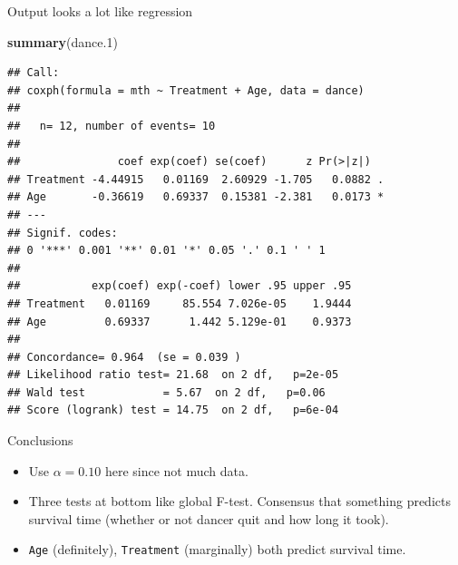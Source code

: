 \documentclass[
  ignorenonframetext,
]{beamer}
\newenvironment{Shaded}{\begin{snugshade}}{\end{snugshade}}
\newcommand{\FloatTok}[1]{\textcolor[rgb]{0.00,0.00,0.81}{#1}}
\newcommand{\KeywordTok}[1]{\textcolor[rgb]{0.13,0.29,0.53}{\textbf{#1}}}
\newcommand{\NormalTok}[1]{#1}
\begin{document}
\begin{frame}[fragile]{Output looks a lot like regression}
\protect\hypertarget{output-looks-a-lot-like-regression}{}

\scriptsize

\begin{Shaded}
\begin{Highlighting}[]
\KeywordTok{summary}\NormalTok{(dance}\FloatTok{.1}\NormalTok{)}
\end{Highlighting}
\end{Shaded}

\begin{verbatim}
## Call:
## coxph(formula = mth ~ Treatment + Age, data = dance)
## 
##   n= 12, number of events= 10 
## 
##               coef exp(coef) se(coef)      z Pr(>|z|)  
## Treatment -4.44915   0.01169  2.60929 -1.705   0.0882 .
## Age       -0.36619   0.69337  0.15381 -2.381   0.0173 *
## ---
## Signif. codes:  
## 0 '***' 0.001 '**' 0.01 '*' 0.05 '.' 0.1 ' ' 1
## 
##           exp(coef) exp(-coef) lower .95 upper .95
## Treatment   0.01169     85.554 7.026e-05    1.9444
## Age         0.69337      1.442 5.129e-01    0.9373
## 
## Concordance= 0.964  (se = 0.039 )
## Likelihood ratio test= 21.68  on 2 df,   p=2e-05
## Wald test            = 5.67  on 2 df,   p=0.06
## Score (logrank) test = 14.75  on 2 df,   p=6e-04
\end{verbatim}

\normalsize

\end{frame}

\begin{frame}[fragile]{Conclusions}
\protect\hypertarget{conclusions-1}{}

\begin{itemize}
\item
  Use \(\alpha=0.10\) here since not much data.
\item
  Three tests at bottom like global F-test. Consensus that something
  predicts survival time (whether or not dancer quit and how long it
  took).
\item
  \texttt{Age} (definitely), \texttt{Treatment} (marginally) both
  predict survival time.
\end{itemize}

\end{frame}
\end{document}
